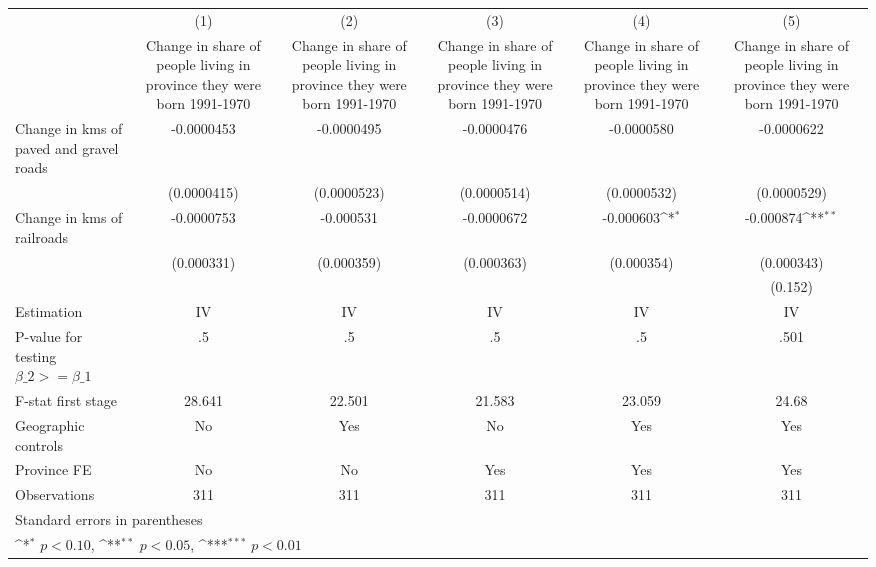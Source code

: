 {
\def\sym#1{\ifmmode^{#1}\else\(^{#1}\)\fi}
\begin{tabular}{l*{5}{c}}
\hline\hline
                    &\multicolumn{1}{c}{(1)}&\multicolumn{1}{c}{(2)}&\multicolumn{1}{c}{(3)}&\multicolumn{1}{c}{(4)}&\multicolumn{1}{c}{(5)}\\
                    &\multicolumn{1}{c}{Change in share of people living in province they were born 1991-1970}&\multicolumn{1}{c}{Change in share of people living in province they were born 1991-1970}&\multicolumn{1}{c}{Change in share of people living in province they were born 1991-1970}&\multicolumn{1}{c}{Change in share of people living in province they were born 1991-1970}&\multicolumn{1}{c}{Change in share of people living in province they were born 1991-1970}\\
\hline
Change in kms of paved and gravel roads&  -0.0000453         &  -0.0000495         &  -0.0000476         &  -0.0000580         &  -0.0000622         \\
                    & (0.0000415)         & (0.0000523)         & (0.0000514)         & (0.0000532)         & (0.0000529)         \\
[1em]
Change in kms of railroads&  -0.0000753         &   -0.000531         &  -0.0000672         &   -0.000603\sym{*}  &   -0.000874\sym{**} \\
                    &  (0.000331)         &  (0.000359)         &  (0.000363)         &  (0.000354)         &  (0.000343)         \\
[1em]
                    &                     &                     &                     &                     &     (0.152)         \\
\hline
Estimation          &          IV         &          IV         &          IV         &          IV         &          IV         \\
P-value for testing $\beta\_2 >= \beta\_1$&          .5         &          .5         &          .5         &          .5         &        .501         \\
F-stat first stage  &      28.641         &      22.501         &      21.583         &      23.059         &       24.68         \\
Geographic controls &          No         &         Yes         &          No         &         Yes         &         Yes         \\
Province FE         &          No         &          No         &         Yes         &         Yes         &         Yes         \\
Observations        &         311         &         311         &         311         &         311         &         311         \\
\hline\hline
\multicolumn{6}{l}{\footnotesize Standard errors in parentheses}\\
\multicolumn{6}{l}{\footnotesize \sym{*} \(p<0.10\), \sym{**} \(p<0.05\), \sym{***} \(p<0.01\)}\\
\end{tabular}
}

